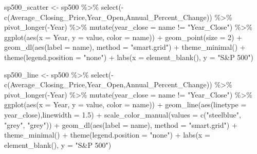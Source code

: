 \documentclass[
  letterpaper,
]{book}
\newenvironment{Shaded}{\begin{snugshade}}{\end{snugshade}}
\newcommand{\AttributeTok}[1]{\textcolor[rgb]{0.40,0.45,0.13}{#1}}
\newcommand{\DecValTok}[1]{\textcolor[rgb]{0.68,0.00,0.00}{#1}}
\newcommand{\FloatTok}[1]{\textcolor[rgb]{0.68,0.00,0.00}{#1}}
\newcommand{\FunctionTok}[1]{\textcolor[rgb]{0.28,0.35,0.67}{#1}}
\newcommand{\NormalTok}[1]{\textcolor[rgb]{0.00,0.23,0.31}{#1}}
\newcommand{\OtherTok}[1]{\textcolor[rgb]{0.00,0.23,0.31}{#1}}
\newcommand{\SpecialCharTok}[1]{\textcolor[rgb]{0.37,0.37,0.37}{#1}}
\newcommand{\StringTok}[1]{\textcolor[rgb]{0.13,0.47,0.30}{#1}}
\begin{document}
\begin{Shaded}
\begin{Highlighting}[]
\NormalTok{sp500\_scatter }\OtherTok{\textless{}{-}}\NormalTok{ sp500 }\SpecialCharTok{\%\textgreater{}\%}
\FunctionTok{select}\NormalTok{(}\SpecialCharTok{{-}}\FunctionTok{c}\NormalTok{(Average\_Closing\_Price,Year\_Open,Annual\_Percent\_Change)) }\SpecialCharTok{\%\textgreater{}\%} \FunctionTok{pivot\_longer}\NormalTok{(}\SpecialCharTok{{-}}\NormalTok{Year) }\SpecialCharTok{\%\textgreater{}\%} \FunctionTok{mutate}\NormalTok{(}\AttributeTok{year\_close =}\NormalTok{ name }\SpecialCharTok{!=} \StringTok{"Year\_Close"}\NormalTok{) }\SpecialCharTok{\%\textgreater{}\%}
\FunctionTok{ggplot}\NormalTok{(}\FunctionTok{aes}\NormalTok{(}\AttributeTok{x =}\NormalTok{ Year, }\AttributeTok{y =}\NormalTok{ value, }\AttributeTok{color =}\NormalTok{ name)) }\SpecialCharTok{+} 
  \FunctionTok{geom\_point}\NormalTok{(}\AttributeTok{size =} \DecValTok{2}\NormalTok{) }\SpecialCharTok{+} 
  \FunctionTok{geom\_dl}\NormalTok{(}\FunctionTok{aes}\NormalTok{(}\AttributeTok{label =}\NormalTok{ name), }\AttributeTok{method =} \StringTok{"smart.grid"}\NormalTok{) }\SpecialCharTok{+}
  \FunctionTok{theme\_minimal}\NormalTok{() }\SpecialCharTok{+} 
  \FunctionTok{theme}\NormalTok{(}\AttributeTok{legend.position =} \StringTok{"none"}\NormalTok{) }\SpecialCharTok{+}
  \FunctionTok{labs}\NormalTok{(}\AttributeTok{x =} \FunctionTok{element\_blank}\NormalTok{(), }\AttributeTok{y =} \StringTok{"S\&P 500"}\NormalTok{)}

\NormalTok{sp500\_line }\OtherTok{\textless{}{-}}\NormalTok{ sp500 }\SpecialCharTok{\%\textgreater{}\%}
\FunctionTok{select}\NormalTok{(}\SpecialCharTok{{-}}\FunctionTok{c}\NormalTok{(Average\_Closing\_Price,Year\_Open,Annual\_Percent\_Change)) }\SpecialCharTok{\%\textgreater{}\%} \FunctionTok{pivot\_longer}\NormalTok{(}\SpecialCharTok{{-}}\NormalTok{Year) }\SpecialCharTok{\%\textgreater{}\%} \FunctionTok{mutate}\NormalTok{(}\AttributeTok{year\_close =}\NormalTok{ name }\SpecialCharTok{!=} \StringTok{"Year\_Close"}\NormalTok{) }\SpecialCharTok{\%\textgreater{}\%}
\FunctionTok{ggplot}\NormalTok{(}\FunctionTok{aes}\NormalTok{(}\AttributeTok{x =}\NormalTok{ Year, }\AttributeTok{y =}\NormalTok{ value, }\AttributeTok{color =}\NormalTok{ name)) }\SpecialCharTok{+} 
  \FunctionTok{geom\_line}\NormalTok{(}\FunctionTok{aes}\NormalTok{(}\AttributeTok{linetype =}\NormalTok{ year\_close),}\AttributeTok{linewidth =} \FloatTok{1.5}\NormalTok{) }\SpecialCharTok{+} 
  \FunctionTok{scale\_color\_manual}\NormalTok{(}\AttributeTok{values =} \FunctionTok{c}\NormalTok{(}\StringTok{"steelblue"}\NormalTok{, }\StringTok{"grey"}\NormalTok{, }\StringTok{"grey"}\NormalTok{)) }\SpecialCharTok{+}
  \FunctionTok{geom\_dl}\NormalTok{(}\FunctionTok{aes}\NormalTok{(}\AttributeTok{label =}\NormalTok{ name), }\AttributeTok{method =} \StringTok{"smart.grid"}\NormalTok{) }\SpecialCharTok{+}
  \FunctionTok{theme\_minimal}\NormalTok{() }\SpecialCharTok{+} 
  \FunctionTok{theme}\NormalTok{(}\AttributeTok{legend.position =} \StringTok{"none"}\NormalTok{) }\SpecialCharTok{+}
  \FunctionTok{labs}\NormalTok{(}\AttributeTok{x =} \FunctionTok{element\_blank}\NormalTok{(), }\AttributeTok{y =} \StringTok{"S\&P 500"}\NormalTok{)}


\end{Highlighting}
\end{Shaded}
\end{document}
